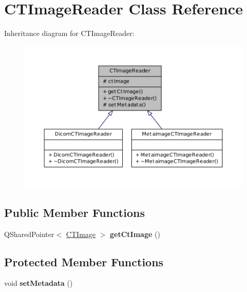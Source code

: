 \hypertarget{class_c_t_image_reader}{
\section{CTImageReader Class Reference}
\label{class_c_t_image_reader}
}


Inheritance diagram for CTImageReader:
\nopagebreak
\begin{figure}[H]
\begin{center}
\leavevmode
\includegraphics[width=400pt]{class_c_t_image_reader__inherit__graph}
\end{center}
\end{figure}
\subsection*{Public Member Functions}
\begin{DoxyCompactItemize}
\item 
\hypertarget{class_c_t_image_reader_a93676f306d5c8b35e2cb5c49cf5ad9f5}{
QSharedPointer$<$ \hyperlink{class_c_t_image}{CTImage} $>$ {\bfseries getCtImage} ()}
\label{class_c_t_image_reader_a93676f306d5c8b35e2cb5c49cf5ad9f5}

\end{DoxyCompactItemize}
\subsection*{Protected Member Functions}
\begin{DoxyCompactItemize}
\item 
\hypertarget{class_c_t_image_reader_a4f02feb0f817c856071d1df52ff67070}{
void {\bfseries setMetadata} ()}
\label{class_c_t_image_reader_a4f02feb0f817c856071d1df52ff67070}

\end{DoxyCompactItemize}
